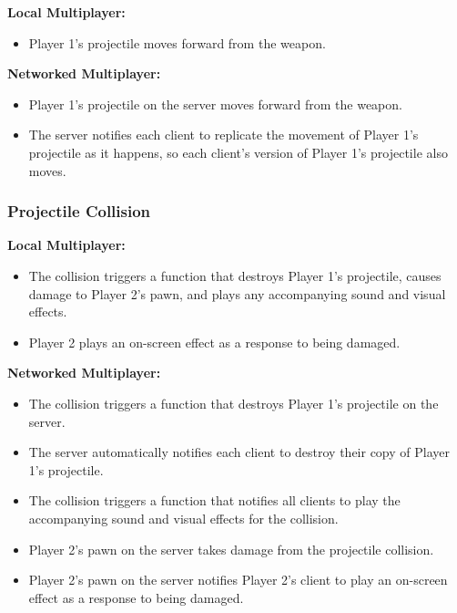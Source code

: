 \documentclass[
  letterpaper,
  DIV=11,
  numbers=noendperiod]{scrartcl}
\providecommand{\tightlist}{%
  \setlength{\itemsep}{0pt}\setlength{\parskip}{0pt}}
\begin{document}
\textbf{Local Multiplayer:}

\begin{itemize}
\tightlist
\item
  Player 1's projectile moves forward from the weapon.
\end{itemize}

\textbf{Networked Multiplayer:}

\begin{itemize}
\tightlist
\item
  Player 1's projectile on the server moves forward from the weapon.
\item
  The server notifies each client to replicate the movement of Player
  1's projectile as it happens, so each client's version of Player 1's
  projectile also moves.
\end{itemize}

\subsubsection{Projectile Collision}\label{projectile-collision}

\textbf{Local Multiplayer:}

\begin{itemize}
\tightlist
\item
  The collision triggers a function that destroys Player 1's projectile,
  causes damage to Player 2's pawn, and plays any accompanying sound and
  visual effects.
\item
  Player 2 plays an on-screen effect as a response to being damaged.
\end{itemize}

\textbf{Networked Multiplayer:}

\begin{itemize}
\tightlist
\item
  The collision triggers a function that destroys Player 1's projectile
  on the server.
\item
  The server automatically notifies each client to destroy their copy of
  Player 1's projectile.
\item
  The collision triggers a function that notifies all clients to play
  the accompanying sound and visual effects for the collision.
\item
  Player 2's pawn on the server takes damage from the projectile
  collision.
\item
  Player 2's pawn on the server notifies Player 2's client to play an
  on-screen effect as a response to being damaged.
\end{itemize}
\end{document}
